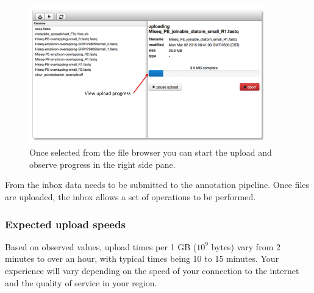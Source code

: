 \documentclass[12pt,fullpage]{report}
\begin{document}
\begin{figure}
\begin{center} 
\includegraphics[width=4in]{Images/upload_progress.png}
\end{center}
\label{fig:upload_progress} 
\caption{Once selected from the file browser you can start the upload and observe progress in the right side pane.}
\end{figure}

From the inbox data needs to be submitted to the annotation pipeline. Once files are uploaded, the inbox allows a set of operations to be performed.








\subsubsection{Expected upload speeds}
Based on observed values, upload times per 1 GB ($10^9$ bytes) vary from 2 minutes to over an hour, with typical times being 10 to 15 minutes. Your experience will vary depending on the speed of your connection to the internet and the quality of service in your region.
\end{document}
